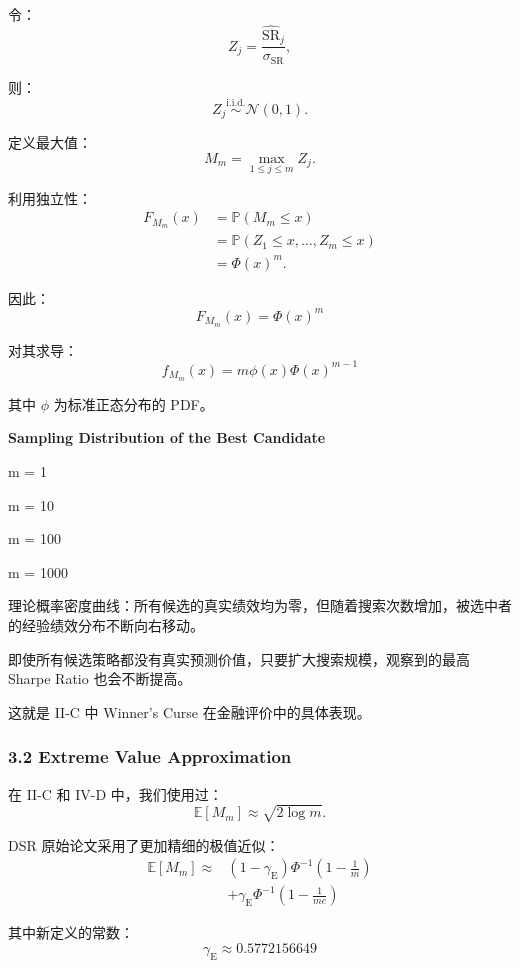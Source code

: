 令：
\[Z_j=
\frac{\widehat{\mathrm{SR}}_j}{\sigma_{\mathrm{SR}}},\]

则：
\[Z_j\overset{\mathrm{i.i.d.}}{\sim}\mathcal N(0,1).\]

定义最大值：
\[M_m=\max_{1\leq j\leq m}Z_j.\]

利用独立性：
\[\begin{aligned}
F_{M_m}(x)
&=\mathbb P(M_m\leq x)\\
&=\mathbb P(Z_1\leq x,\ldots,Z_m\leq x)\\
&=\Phi(x)^m.
\end{aligned}\]

因此：
\[\boxed{
F_{M_m}(x)=\Phi(x)^m
}\]

对其求导：
\[\boxed{
f_{M_m}(x)
=
m\phi(x)\Phi(x)^{m-1}
}\]

其中 \(\phi\) 为标准正态分布的 PDF。

\textbf{Sampling Distribution of the Best Candidate}


m = 1

m = 10

m = 100

m = 1000

理论概率密度曲线：所有候选的真实绩效均为零，但随着搜索次数增加，被选中者的经验绩效分布不断向右移动。

即使所有候选策略都没有真实预测价值，只要扩大搜索规模，观察到的最高 Sharpe Ratio 也会不断提高。

这就是 II-C 中 Winner's Curse 在金融评价中的具体表现。

\hypertarget{part-4-71-0001-extreme-value-approximation}{%
\subsubsection{3.2 Extreme Value Approximation}\label{part-4-71-0001-extreme-value-approximation}}

在 II-C 和 IV-D 中，我们使用过：
\[\mathbb E[M_m]\approx\sqrt{2\log m}.\]

DSR 原始论文采用了更加精细的极值近似：
\[\boxed{
\begin{aligned}
\mathbb E[M_m]\approx{}&
(1-\gamma_{\mathrm E})
\Phi^{-1}\left(1-\frac1m\right)\\
&+\gamma_{\mathrm E}
\Phi^{-1}\left(1-\frac1{me}\right)
\end{aligned}
}\]

其中新定义的常数：
\[\gamma_{\mathrm E}\approx0.5772156649\]

